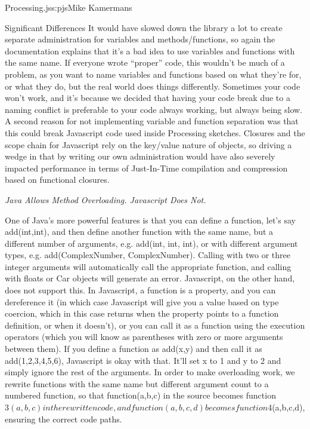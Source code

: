 \begin{aosachapter}{Processing.js}{s:pjs}{Mike Kamermans}
\begin{aosasect1}{Significant Differences}
It would have slowed down the library a lot to create separate
administration for variables and methods/functions, so again the
documentation explains that it's a bad idea to use variables and
functions with the same name. If everyone wrote ``proper'' code, this
wouldn't be much of a problem, as you want to name variables and
functions based on what they're for, or what they do, but the real
world does things differently. Sometimes your code won't work, and
it's because we decided that having your code break due to a naming
conflict is preferable to your code always working, but always being
slow. A second reason for not implementing variable and function
separation was that this could break Javascript code used inside
Processing sketches. Closures and the scope chain for Javascript rely
on the key/value nature of objects, so driving a wedge in that by
writing our own administration would have also severely impacted
performance in terms of Just-In-Time compilation and compression based
on functional closures.

\emph{Java Allows Method Overloading. Javascript Does Not.}

One of Java's more powerful features is that you can define a
function, let's say add(int,int), and then define another function
with the same name, but a different number of arguments, e.g. add(int,
int, int), or with different argument types, e.g. add(ComplexNumber,
ComplexNumber). Calling  with two or three integer arguments will
automatically call the appropriate function, and calling  with
floats or Car objects will generate an error. Javascript, on the other
hand, does not support this. In Javascript, a function is a property,
and you can dereference it (in which case Javascript will give you a
value based on type coercion, which in this case returns  when
the property points to a function definition, or  when it
doesn't), or you can call it as a function using the execution
operators (which you will know as parentheses with zero or more
arguments between them). If you define a function as add(x,y) and then
call it as add(1,2,3,4,5,6), Javascript is okay with that. It'll set x
to 1 and y to 2 and simply ignore the rest of the arguments. In order
to make overloading work, we rewrite functions with the same name but
different argument count to a numbered function, so that
function(a,b,c) in the source becomes function$3(a,b,c) in the
rewritten code, and function(a,b,c,d) becomes function$4(a,b,c,d),
ensuring the correct code paths.


\end{aosasect1}
\end{aosachapter}
